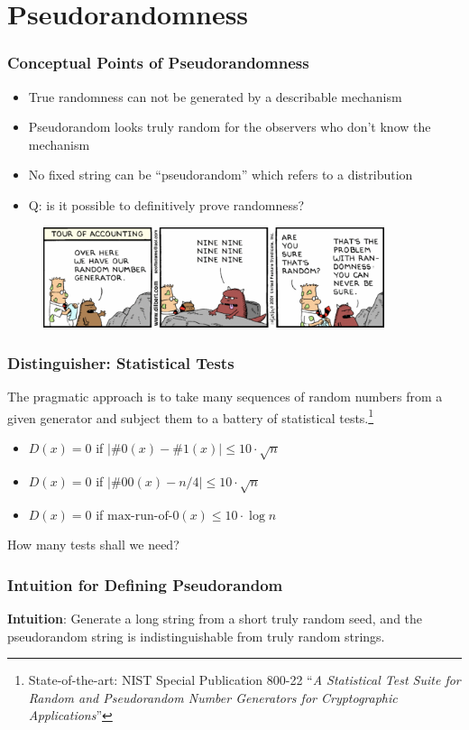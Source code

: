 \section{Pseudorandomness}
\begin{frame}\frametitle{Conceptual Points of Pseudorandomness}
\begin{itemize}
\item True randomness can not be generated by a describable mechanism
\item Pseudorandom looks truly random for the observers who don't know the mechanism 
\item No fixed string can be ``pseudorandom'' which refers to a distribution
\item \alert{Q: is it possible to definitively prove randomness?}
\end{itemize}
\begin{figure}
\begin{center}
\includegraphics[width=100mm]{pic/random-color} 
\end{center}
\end{figure}
\end{frame}
\begin{frame}\frametitle{Distinguisher: Statistical Tests}
The pragmatic approach is to take many sequences of random numbers from a given generator and subject them to a battery of statistical tests.\footnote{State-of-the-art: NIST Special Publication 800-22 ``\emph{A Statistical Test Suite for Random and Pseudorandom Number Generators for Cryptographic Applications}''}
\begin{exampleblock}{}
\begin{itemize}
\item $D(x)=0$ if $\left| \#0(x) - \#1(x)\right| \le 10\cdot \sqrt{n}$
\item $D(x)=0$ if $\left| \#00(x) - n/4\right| \le 10\cdot \sqrt{n}$
\item $D(x)=0$ if $\text{max-run-of-}0(x) \le 10\cdot \log{n}$
\end{itemize}
\end{exampleblock}
How many tests shall we need?
\end{frame}
\begin{frame}\frametitle{Intuition for Defining Pseudorandom}
\textbf{Intuition}: Generate a long string from a short truly random seed, and the pseudorandom string is indistinguishable from truly random strings.
\begin{figure}
\begin{center}

\end{center}
\end{figure}
\end{frame}
